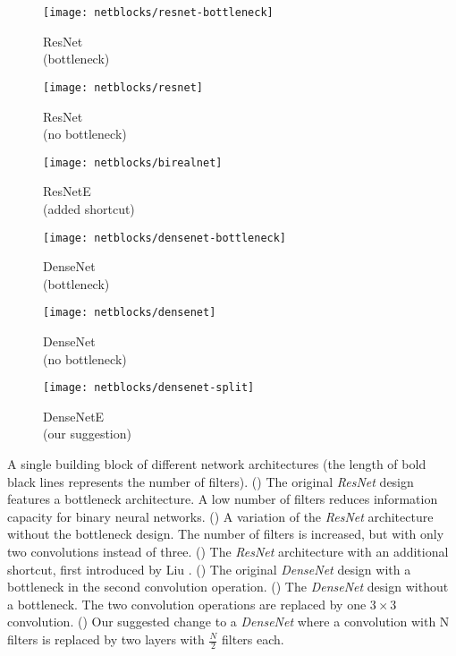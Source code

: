 \documentclass[10pt,twocolumn,letterpaper]{article}
\newcommand{\architecture}[1]{\emph{#1}}
\begin{document}
\begin{center}
\begin{subfigure}[t]{0.32\linewidth}
   \centering
   \texttt{[image: netblocks/resnet-bottleneck]}
   \caption{ResNet \\ (bottleneck)}
   \label{fig:netblocks-resnet-bottleneck}
\end{subfigure}
\begin{subfigure}[t]{0.32\linewidth}
   \centering
   \texttt{[image: netblocks/resnet]}
   \caption{ResNet \\ (no bottleneck)}
   \label{fig:netblocks-resnet}
\end{subfigure}
\begin{subfigure}[t]{0.32\linewidth}
   \centering
   \texttt{[image: netblocks/birealnet]}
   \caption{ResNetE \\ (added shortcut)}
   \label{fig:netblocks-resnete}
\end{subfigure}
\begin{subfigure}[t]{0.32\linewidth}
   \centering
   \texttt{[image: netblocks/densenet-bottleneck]}
   \caption{DenseNet \\ (bottleneck)}
   \label{fig:netblocks-densenet-bottleneck}
\end{subfigure}
\begin{subfigure}[t]{0.32\linewidth}
   \centering
   \texttt{[image: netblocks/densenet]}
   \caption{DenseNet \\ (no bottleneck)}
   \label{fig:netblocks-densenet}
\end{subfigure}
\begin{subfigure}[t]{0.32\linewidth}
   \centering
   \texttt{[image: netblocks/densenet-split]}
   \caption{DenseNetE \\ (our suggestion)}
   \label{fig:netblocks-densenet-split}
\end{subfigure}
\end{center}
\caption{
   A single building block of different network architectures (the length of bold black lines represents the number of filters).
    () The original \architecture{ResNet} design features a bottleneck architecture.
    A low number of filters reduces information capacity for binary neural networks.
    () A variation of the \architecture{ResNet} architecture without the bottleneck design.
    The number of filters is increased, but with only two convolutions instead of three.
    () The \architecture{ResNet} architecture with an additional shortcut, first introduced by Liu \etal \cite{Liu_2018_ECCV}.
    () The original \architecture{DenseNet} design with a bottleneck in the second convolution operation.
    () The \architecture{DenseNet} design without a bottleneck.
    The two convolution operations are replaced by one $3\times3$ convolution.
    () Our suggested change to a \architecture{DenseNet} where a convolution with N filters is replaced by two layers with $\frac{N}{2}$ filters each.
}
\end{document}
